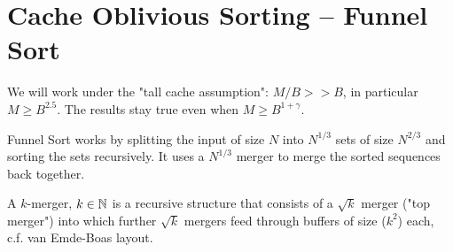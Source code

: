 \section{Cache Oblivious Sorting -- Funnel Sort}

We will work under the "tall cache assumption": $M/B>> B$, in particular $M\geq B^{2.5}$. The results stay true even when $M\geq B^{1+\gamma}$.

Funnel Sort works by splitting the input of size $N$ into $N^{1/3}$ sets of size $N^{2/3}$ and sorting the sets recursively. It uses a $N^{1/3}$ merger to merge the sorted sequences back together.

A $k$-merger, $k\in \mathbb{N}$ is a recursive structure that consists of a $\sqrt k$ merger ("top merger") into which further $\sqrt{k}$ mergers feed through buffers of size ($k^2$) each, c.f. van Emde-Boas layout.